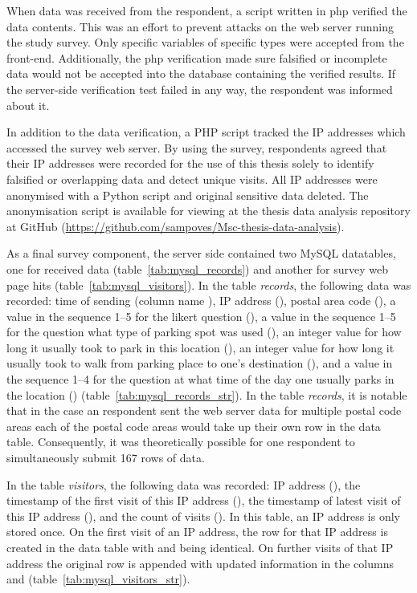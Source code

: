 When data was received from the respondent, a script written in \gls{php} verified the data contents. This was an effort to prevent attacks on the web server running the study survey. Only specific variables of specific types were accepted from the front-end. Additionally, the \gls{php} verification made sure falsified or incomplete data would not be accepted into the database containing the verified results. If the server-side verification test failed in any way, the respondent was informed about it. 

In addition to the data verification, a PHP script tracked the IP addresses which accessed the survey web server. By using the survey, respondents agreed that their IP addresses were recorded for the use of this thesis solely to identify falsified or overlapping data and detect unique visits. All IP addresses were anonymised with a Python script and original sensitive data deleted. The anonymisation script is available for viewing at the thesis data analysis repository at GitHub (\textcolor{blue}{\url{https://github.com/sampoves/Msc-thesis-data-analysis}}).

As a final survey component, the server side contained two MySQL datatables, one for received data (table~\ref{tab:mysql_records}) and another for survey web page hits (table~\ref{tab:mysql_visitors}). In the table \textit{records}, the following data was recorded: time of sending (column name ), IP address (), postal area code (), a value in the sequence 1--5 for the likert question (), a value in the sequence 1--5 for the question what type of parking spot was used (), an integer value for how long it usually took to park in this location (), an integer value for how long it usually took to walk from parking place to one's destination (), and a value in the sequence 1--4 for the question at what time of the day one usually parks in the location () (table~\ref{tab:mysql_records_str}). In the table \textit{records}, it is notable that in the case an respondent sent the web server data for multiple postal code areas each of the postal code areas would take up their own row in the data table. Consequently, it was theoretically possible for one respondent to simultaneously submit 167 rows of data.

In the table \textit{visitors}, the following data was recorded: IP address (), the timestamp of the first visit of this IP address (), the timestamp of latest visit of this IP address (), and the count of visits (). In this table, an IP address is only stored once. On the first visit of an IP address, the row for that IP address is created in the data table with  and  being identical. On further visits of that IP address the original row is appended with updated information in the columns  and  (table~\ref{tab:mysql_visitors_str}).

